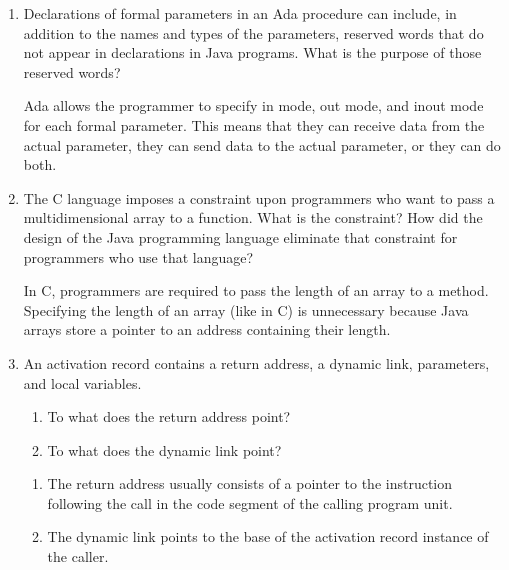 \begin{enumerate}
\begin{answer}
  \end{answer}

  \item Declarations of formal parameters in an Ada procedure
    can include, in addition to the names and types of the
    parameters, reserved words that do not appear in declarations
    in Java programs. 
    What is the purpose of those reserved words?

  \begin{answer}

    Ada allows the programmer to specify in mode, out mode,
    and inout mode for each formal parameter.  This means that
    they can receive data from the actual parameter, they can
    send data to the actual parameter, or they can do both.

  \end{answer}

  \item The C language imposes a constraint upon programmers
    who want to pass a multidimensional array to a function.
    What is the constraint? How did the design of the Java
    programming language eliminate that constraint for 
    programmers who use that language?

  \begin{answer}

    In C, programmers are required to pass the length of an
    array to a method. Specifying the length of an array
    (like in C) is unnecessary because Java arrays store a
    pointer to an address containing their length.

  \end{answer}

  \item An activation record contains a return
    address, a dynamic link, parameters, and
    local variables.
  \begin{enumerate}
    \item To what does the return address point?
    \item To what does the dynamic link point?
  \end{enumerate}

  \begin{answer}

    \begin{enumerate}
      \item The return address usually consists of a pointer
      to the instruction following the call in the code
      segment of the calling program unit.
      \item The dynamic link points to the base of the
      activation record instance of the caller.
    \end{enumerate}


\end{answer}
\end{enumerate}
